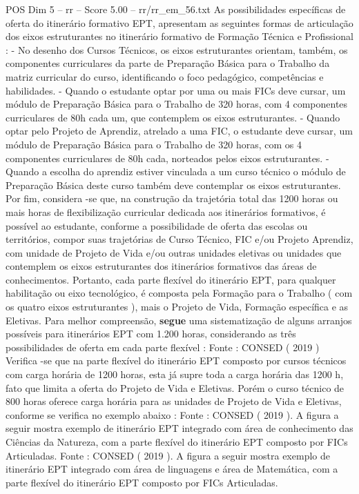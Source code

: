 \begin{textsample}{POS Dim 5 – rr – Score 5.00 – rr/rr\_em\_56.txt}
As possibilidades específicas de oferta do itinerário formativo EPT, apresentam as seguintes formas de articulação dos eixos estruturantes no itinerário formativo de Formação Técnica e Profissional : - No desenho dos Cursos Técnicos, os eixos estruturantes orientam, também, os componentes curriculares da parte de Preparação Básica para o Trabalho da matriz curricular do curso, identificando o foco pedagógico, competências e habilidades. - Quando o estudante optar por uma ou mais FICs deve cursar, um módulo de Preparação Básica para o Trabalho de 320 horas, com 4 componentes curriculares de 80h cada um, que contemplem os eixos estruturantes. - Quando optar pelo Projeto de Aprendiz, atrelado a uma FIC, o estudante deve cursar, um módulo de Preparação Básica para o Trabalho de 320 horas, com os 4 componentes curriculares de 80h cada, norteados pelos eixos estruturantes. - Quando a escolha do aprendiz estiver vinculada a um curso técnico o módulo de Preparação Básica deste curso também deve contemplar os eixos estruturantes.
Por fim, considera -se que, na construção da trajetória total das 1200 horas ou mais horas de flexibilização curricular dedicada aos itinerários formativos, é possível ao estudante, conforme a possibilidade de oferta das escolas ou territórios, compor suas trajetórias de Curso Técnico, FIC e/ou Projeto Aprendiz, com unidade de Projeto de Vida e/ou outras unidades eletivas ou unidades que contemplem os eixos estruturantes dos itinerários formativos das áreas de conhecimentos.
Portanto, cada parte flexível do itinerário EPT, para qualquer habilitação ou eixo tecnológico, é composta pela Formação para o Trabalho ( com os quatro eixos estruturantes ), mais o Projeto de Vida, Formação específica e as Eletivas.
Para melhor compreensão, \textbf{segue} uma sistematização de alguns arranjos possíveis para itinerários EPT com 1.200 horas, considerando as três possibilidades de oferta em cada parte flexível : Fonte : CONSED ( 2019 ) Verifica -se que na parte flexível do itinerário EPT composto por cursos técnicos com carga horária de 1200 horas, esta já supre toda a carga horária das 1200 h, fato que limita a oferta do Projeto de Vida e Eletivas.
Porém o curso técnico de 800 horas oferece carga horária para as unidades de Projeto de Vida e Eletivas, conforme se verifica no exemplo abaixo : Fonte : CONSED ( 2019 ).
A figura a seguir mostra exemplo de itinerário EPT integrado com área de conhecimento das Ciências da Natureza, com a parte flexível do itinerário EPT composto por FICs Articuladas.
Fonte : CONSED ( 2019 ).
A figura a seguir mostra exemplo de itinerário EPT integrado com área de linguagens e área de Matemática, com a parte flexível do itinerário EPT composto por FICs Articuladas.

\end{textsample}
